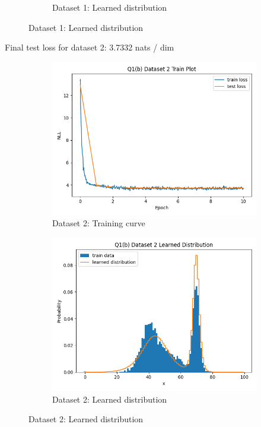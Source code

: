 \documentclass{article}
\begin{document}
\begin{enumerate}[(a)]
\begin{figure}[H]
\begin{subfigure}{0.45\textwidth}
        \caption{Dataset 1: Learned distribution}
    \end{subfigure}
\end{figure}
Final test loss for dataset 2: 3.7332 nats / dim
\begin{figure}[H]
    \centering
    \begin{subfigure}{0.45\textwidth}
        \centering
        \includegraphics[width=\textwidth]{figures/q1_b_dset2_train_plot.png}
        \caption{Dataset 2: Training curve}
    \end{subfigure}
    \hspace{0.2in}
    \begin{subfigure}{0.45\textwidth}
        \centering
        \includegraphics[width=\textwidth]{figures/q1_b_dset2_learned_dist.png}
        \caption{Dataset 2: Learned distribution}
    \end{subfigure}
\end{figure}
\end{enumerate}
\end{document}
